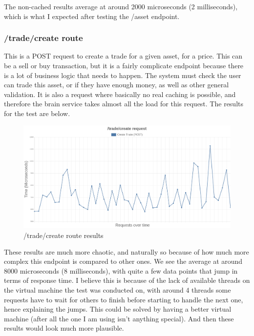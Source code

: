 \documentclass[titlepage]{article}
\begin{document}
The non-cached results average at around 2000 microseconds (2 milliseconds), which is what I expected after testing the /asset endpoint.

\pagebreak
\subsubsection{/trade/create route}
This is a POST request to create a trade for a given asset, for a price. This can be a sell or buy transaction, but it is a fairly complicate endpoint because there is a lot of business logic that needs to happen. The system must check the user can trade this asset, or if they have enough money, as well as other general validation. It is also a request where basically no real caching is possible, and therefore the brain service takes almost all the load for this request. The results for the test are below.

\begin{figure}[h!]
\includegraphics[width=\textwidth]{../results/create-trade.png}
  \caption{/trade/create route results}
\end{figure}

These results are much more chaotic, and naturally so because of how much more complex this endpoint is compared to other ones. We see the average at around 8000 microseconds (8 milliseconds), with quite a few data points that jump in terms of response time. I believe this is because of the lack of available threads on the virtual machine the test was conducted on, with around 4 threads some requests have to wait for others to finish before starting to handle the next one, hence explaining the jumps. This could be solved by having a better virtual machine (after all the one I am using isn't anything special). And then these results would look much more plausible. \\

\pagebreak
\end{document}
